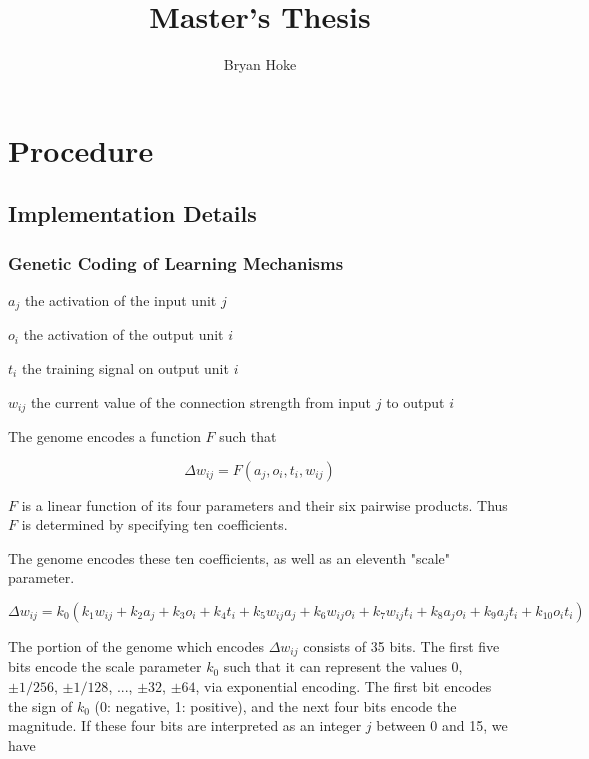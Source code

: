 \documentclass[master]{outhesis}
\title{Master's Thesis}
\author{Bryan Hoke}
\begin{document}
\makefrontmatter

\section{Procedure}

\subsection{Implementation Details}

\subsubsection{Genetic Coding of Learning Mechanisms}

\begin{center}
	$a_j$ the activation of the input unit $j$
\end{center}

\begin{center}
	$o_i$ the activation of the output unit $i$
\end{center}

\begin{center}
	$t_i$ the training signal on output unit $i$
\end{center}

\begin{center}
	$w_{ij}$ the current value of the connection strength from input $j$ to output $i$
\end{center}

The genome encodes a function $F$ such that

\[
	\Delta w_{ij} = F(a_j, o_i, t_i, w_{ij})
\]

$F$ is a linear function of its four parameters and their six pairwise products. Thus $F$ is determined by specifying ten coefficients.

The genome encodes these ten coefficients, as well as an eleventh "scale" parameter.

\[
	\Delta w_{ij} = k_0(k_1w_{ij}+k_2a_j+k_3o_i+k_4t_i+k_5w_{ij}a_j+k_6w_{ij}o_i+k_7w_{ij}t_{i}+k_8a_jo_i+k_9a_jt_i+k_{10}o_it_i)
\]

The portion of the genome which encodes $\Delta w_{ij}$ consists of 35 bits. The first five bits encode the scale parameter $k_0$ such that it can represent the values $0$, $\pm 1/256$, $\pm 1/128$, ..., $\pm 32$, $\pm 64$, via exponential encoding. The first bit encodes the sign of $k_0$ (0: negative, 1: positive), and the next four bits encode the magnitude. If these four bits are interpreted as an integer $j$ between 0 and 15, we have
\end{document}
